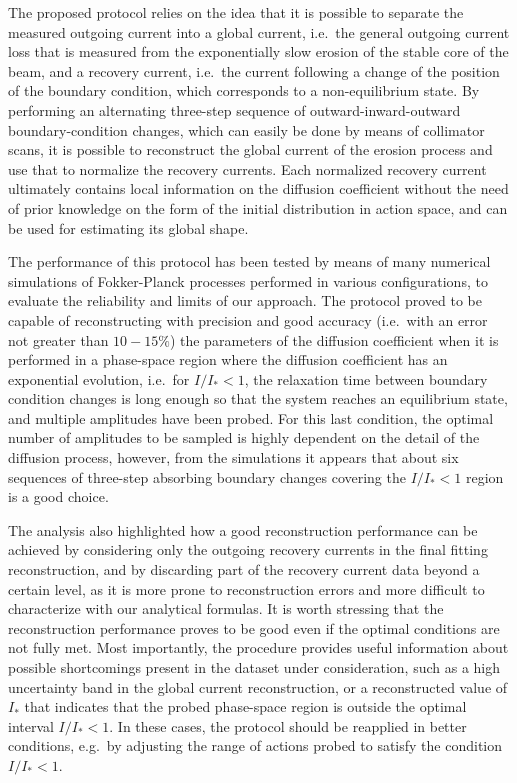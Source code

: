 The proposed protocol relies on the idea that it is possible to separate the measured outgoing current into a global current, i.e.\ the general outgoing current loss that is measured from the exponentially slow erosion of the stable core of the beam, and a recovery current, i.e.\ the current following a change of the position of the boundary condition, which corresponds to a non-equilibrium state. By performing an alternating three-step sequence of outward-inward-outward boundary-condition changes, which can easily be done by means of collimator scans, it is possible to reconstruct the global current of the erosion process and use that to normalize the recovery currents. Each normalized recovery current ultimately contains local information on the diffusion coefficient without the need of prior knowledge on the form of the initial distribution in action space, and can be used for estimating its global shape.

The performance of this protocol has been tested by means of many numerical simulations of Fokker-Planck processes performed in various configurations, to evaluate the reliability and limits of our approach. The protocol proved to be capable of reconstructing with precision and good accuracy  {(i.e.\ with an error not greater than $10-15\%$)} the parameters of the diffusion coefficient when it is performed in a phase-space region where the diffusion coefficient has an exponential evolution, i.e.\ for $I/I_\ast < 1$, the relaxation time between boundary condition changes is long enough so that the system reaches an equilibrium state, and multiple amplitudes have been probed. For this last condition, the optimal number of amplitudes to be sampled is highly dependent on the detail of the diffusion process, however, from the simulations it appears that about six sequences of three-step absorbing boundary changes covering the $I / I_\ast < 1$ region is a good choice. 

The analysis also highlighted how a good reconstruction performance can be achieved by considering only the outgoing recovery currents in the final fitting reconstruction, and by discarding part of the recovery current data beyond a certain level, as it is more prone to reconstruction errors and more difficult to characterize with our analytical formulas. It is worth stressing that the reconstruction performance proves to be good even if the optimal conditions are not fully met. Most importantly, the procedure provides useful information about possible shortcomings present in the dataset under consideration, such as a high uncertainty band in the global current reconstruction, or a reconstructed value of $I_\ast$ that indicates that the probed phase-space region is outside the optimal interval $I / I_\ast < 1$. In these cases, the protocol should be reapplied in better conditions, e.g.\ by adjusting the range of actions probed to satisfy the condition $I / I_\ast < 1$.


